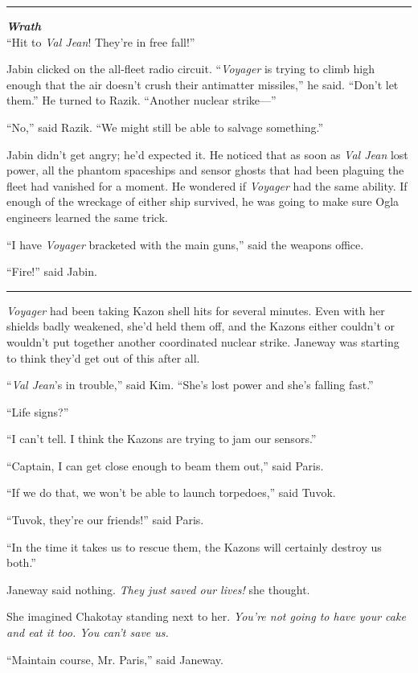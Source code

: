 \documentclass[twoside,letterpaper,12pt]{memoir}
\begin{document}
\fancybreak{\rule{3cm}{0.4 pt}}
\noindent\textit{\textbf{Wrath}}\\

``Hit to \textit{Val Jean}! They're in free fall!''

Jabin clicked on the all-fleet radio circuit. ``\textit{Voyager} is trying to climb high enough that the air doesn't crush their antimatter missiles,'' he said. ``Don't let them.'' He turned to Razik. ``Another nuclear strike---''

``No,'' said Razik. ``We might still be able to salvage something.''

Jabin didn't get angry; he'd expected it. He noticed that as soon as \textit{Val Jean} lost power, all the phantom spaceships and sensor ghosts that had been plaguing the fleet had vanished for a moment. He wondered if \textit{Voyager} had the same ability. If enough of the wreckage of either ship survived, he was going to make sure Ogla engineers learned the same trick.

``I have \textit{Voyager} bracketed with the main guns,'' said the weapons office.

``Fire!'' said Jabin.

\fancybreak{\rule{3cm}{0.4 pt}}
\textit{Voyager} had been taking Kazon shell hits for several minutes. Even with her shields badly weakened, she'd held them off, and the Kazons either couldn't or wouldn't put together another coordinated nuclear strike. Janeway was starting to think they'd get out of this after all.

``\textit{Val Jean}'s in trouble,'' said Kim. ``She's lost power and she's falling fast.''

``Life signs?''

``I can't tell. I think the Kazons are trying to jam our sensors.''

``Captain, I can get close enough to beam them out,'' said Paris.

``If we do that, we won't be able to launch torpedoes,'' said Tuvok.

``Tuvok, they're our friends!'' said Paris.

``In the time it takes us to rescue them, the Kazons will certainly destroy us both.''

Janeway said nothing. \textit{They just saved our lives!} she thought.

She imagined Chakotay standing next to her. \textit{You're not going to have your cake and eat it too. You can't save us.}

``Maintain course, Mr. Paris,'' said Janeway.
\end{document}
